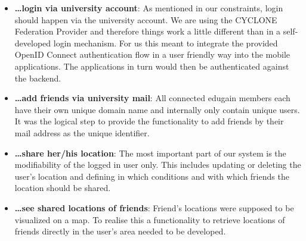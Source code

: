 \begin{itemize}
    \item \textbf{\ldots login via university account}: As mentioned in our constraints, login should happen via the university account. We are using the CYCLONE Federation Provider and therefore things work a little different than in a self-developed login mechanism. For us this meant to integrate the provided OpenID Connect authentication flow in a user friendly way into the mobile applications. The applications in turn would then be authenticated against the backend.
    \item \textbf{\ldots add friends via university mail}: All connected edugain members each have their own unique domain name and internally only contain unique users. It was the logical step to provide the functionality to add friends by their mail address as the unique identifier.
    \item \textbf{\ldots share her/his location}: The most important part of our system is the modifiability of the logged in user only. This includes updating or deleting the user's location and defining in which conditions and with which friends the location should be shared.
    \item \textbf{\ldots see shared locations of friends}: Friend's locations were supposed to be visualized on a map. To realise this a functionality to retrieve locations of friends directly in the user's area needed to be developed.
\end{itemize}

